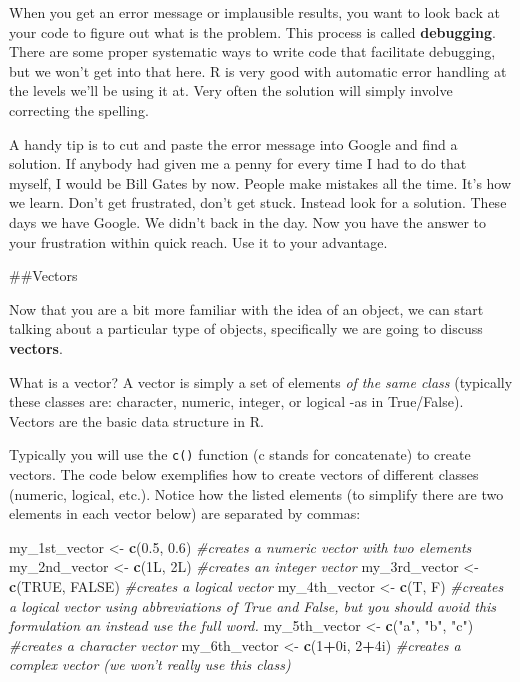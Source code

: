 \documentclass[]{book}
\newenvironment{Shaded}{\begin{snugshade}}{\end{snugshade}}
\newcommand{\CommentTok}[1]{\textcolor[rgb]{0.56,0.35,0.01}{\textit{#1}}}
\newcommand{\DecValTok}[1]{\textcolor[rgb]{0.00,0.00,0.81}{#1}}
\newcommand{\FloatTok}[1]{\textcolor[rgb]{0.00,0.00,0.81}{#1}}
\newcommand{\KeywordTok}[1]{\textcolor[rgb]{0.13,0.29,0.53}{\textbf{#1}}}
\newcommand{\NormalTok}[1]{#1}
\newcommand{\OperatorTok}[1]{\textcolor[rgb]{0.81,0.36,0.00}{\textbf{#1}}}
\newcommand{\OtherTok}[1]{\textcolor[rgb]{0.56,0.35,0.01}{#1}}
\newcommand{\StringTok}[1]{\textcolor[rgb]{0.31,0.60,0.02}{#1}}
\theoremstyle{definition}
\theoremstyle{definition}
\theoremstyle{definition}
\theoremstyle{remark}
\begin{document}
When you get an error message or implausible results, you want to look
back at your code to figure out what is the problem. This process is
called \textbf{debugging}. There are some proper systematic ways to
write code that facilitate debugging, but we won't get into that here. R
is very good with automatic error handling at the levels we'll be using
it at. Very often the solution will simply involve correcting the
spelling.

A handy tip is to cut and paste the error message into Google and find a
solution. If anybody had given me a penny for every time I had to do
that myself, I would be Bill Gates by now. People make mistakes all the
time. It's how we learn. Don't get frustrated, don't get stuck. Instead
look for a solution. These days we have Google. We didn't back in the
day. Now you have the answer to your frustration within quick reach. Use
it to your advantage.

\#\#Vectors

Now that you are a bit more familiar with the idea of an object, we can
start talking about a particular type of objects, specifically we are
going to discuss \textbf{vectors}.

What is a vector? A vector is simply a set of elements \emph{of the same
class} (typically these classes are: character, numeric, integer, or
logical -as in True/False). Vectors are the basic data structure in R.

Typically you will use the \texttt{c()} function (c stands for
concatenate) to create vectors. The code below exemplifies how to create
vectors of different classes (numeric, logical, etc.). Notice how the
listed elements (to simplify there are two elements in each vector
below) are separated by commas:

\begin{Shaded}
\begin{Highlighting}[]
\NormalTok{my_1st_vector <-}\StringTok{ }\KeywordTok{c}\NormalTok{(}\FloatTok{0.5}\NormalTok{, }\FloatTok{0.6}\NormalTok{) }\CommentTok{#creates a numeric vector with two elements}
\NormalTok{my_2nd_vector <-}\StringTok{ }\KeywordTok{c}\NormalTok{(1L, 2L) }\CommentTok{#creates an integer vector}
\NormalTok{my_3rd_vector <-}\StringTok{ }\KeywordTok{c}\NormalTok{(}\OtherTok{TRUE}\NormalTok{, }\OtherTok{FALSE}\NormalTok{) }\CommentTok{#creates a logical vector}
\NormalTok{my_4th_vector <-}\StringTok{ }\KeywordTok{c}\NormalTok{(T, F) }\CommentTok{#creates a logical vector using abbreviations of True and False, but you should avoid this formulation an instead use the full word.}
\NormalTok{my_5th_vector <-}\StringTok{ }\KeywordTok{c}\NormalTok{(}\StringTok{"a"}\NormalTok{, }\StringTok{"b"}\NormalTok{, }\StringTok{"c"}\NormalTok{) }\CommentTok{#creates a character vector}
\NormalTok{my_6th_vector <-}\StringTok{ }\KeywordTok{c}\NormalTok{(}\DecValTok{1}\OperatorTok{+}\NormalTok{0i, }\DecValTok{2}\OperatorTok{+}\NormalTok{4i) }\CommentTok{#creates a complex vector (we won't really use this class)}
\end{Highlighting}
\end{Shaded}
\end{document}
